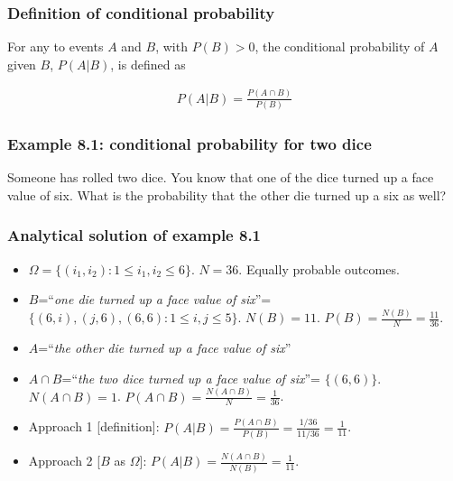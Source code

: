 \begin{frame}
    \frametitle{Definition of conditional probability}
    \label{slide:defCondProb}

    \begin{probDef}

		For any to events $A$ and $B$, with $P(B)>0$, the conditional
probability of $A$ given $B$, $P(A|B)$, is defined as 

		\begin{align*}
			P(A|B)=\frac{P(A\cap B)}{P(B)}
		\end{align*}

	\end{probDef}

\end{frame}

\begin{frame}
    \frametitle{Example 8.1: conditional probability for two dice}

	\begin{manualProbExample}{8.1}
		Someone has rolled two dice. You know that one of the dice turned up a
face value of six. What is the probability that the other die turned up a six
as  well?
	\end{manualProbExample}

\end{frame}

\begin{frame}
    \frametitle{Analytical solution of example 8.1}

    \begin{itemize}[<+->]

		\item $\Omega=\{(i_1,i_2): 1\le i_1,i_2\le6\}$. $N=36$. Equally probable outcomes.

		\item $B$=``\textit{one die turned up a face value of six}''=
$\{(6,i),(j,6),(6,6):1\le i,j\le 5\}$. $N(B)=11$. $P(B)=\frac{N(B)}{N}=\frac{11}{36}$.

		\item $A$=``\textit{the other die turned up a face value of six}''

		\item $A\cap B$=``\textit{the two dice turned up a face value of six}''=
$\{(6,6)\}$. $N(A\cap B)=1$. $P(A\cap B)=\frac{N(A\cap B)}{N}=\frac{1}{36}$.

		\item Approach 1 [definition]: $P(A|B)=\frac{P(A\cap B)}{P(B)}=\frac{1/36}{11/36}=\frac{1}{11}$.

		\item Approach 2 [$B$ as $\Omega$]: $P(A|B)=\frac{N(A\cap B)}{N(B)}=\frac{1}{11}$.

    \end{itemize}

\end{frame}

